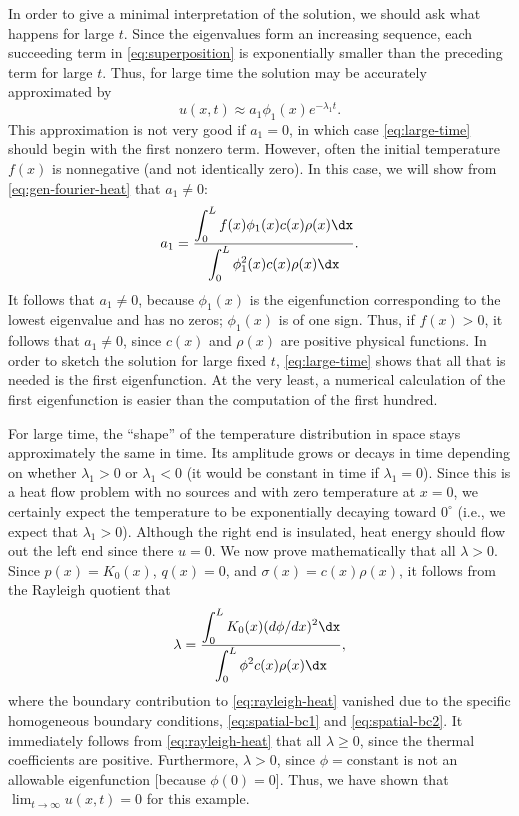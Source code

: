 In order to give a minimal interpretation of the solution, we should ask what happens for large $t$.  Since the eigenvalues form an increasing sequence, each succeeding term in \eqref{eq:superposition} is exponentially smaller than the preceding term for large $t$.  Thus, for large time the solution may be accurately approximated by
\begin{equation}
\label{eq:large-time}
u(x,t) \approx a_1\phi_1(x)e^{-\lambda_1 t}.
\end{equation}
This approximation is not very good if $a_1 = 0$, in which case \eqref{eq:large-time} should begin with the first nonzero term.  However, often the initial temperature $f(x)$ is nonnegative (and not identically zero).  In this case, we will show from \eqref{eq:gen-fourier-heat} that $a_1 \neq 0$:
\begin{equation}
\label{eq:a1-nonzero}
a_1 = \frac{\displaystyle\int_0^L f(x)\phi_1(x)c(x)\rho(x)\dx}{\displaystyle\int_0^L \phi_1^2(x)c(x)\rho(x)\dx}.
\end{equation}
It follows that $a_1 \neq 0$, because $\phi_1(x)$ is the eigenfunction corresponding to the lowest eigenvalue and has no zeros; $\phi_1(x)$ is of one sign.  Thus, if $f(x) > 0$, it follows that $a_1 \neq 0$, since $c(x)$ and $\rho(x)$ are positive physical functions.  In order to sketch the solution for large fixed $t$, \eqref{eq:large-time} shows that all that is needed is the first eigenfunction.  At the very least, a numerical calculation of the first eigenfunction is easier than the computation of the first hundred.

For large time, the ``shape'' of the temperature distribution in space stays approximately the same in time.  Its amplitude grows or decays in time depending on whether $\lambda_1 > 0$ or $\lambda_1 < 0$ (it would be constant in time if $\lambda_1 = 0$).  Since this is a heat flow problem with no sources and with zero temperature at $x = 0$, we certainly expect the temperature to be exponentially decaying toward $0^\circ$ (i.e., we expect that $\lambda_1 > 0$).  Although the right end is insulated, heat energy should flow out the left end since there $u = 0$.  We now prove mathematically that all $\lambda > 0$.  Since $p(x) = K_0(x)$, $q(x) = 0$, and $\sigma(x) = c(x)\rho(x)$, it follows from the Rayleigh quotient that
\begin{equation}
\label{eq:rayleigh-heat}
\lambda = \frac{\displaystyle\int_0^L K_0(x)(d\phi/dx)^2\dx}{\displaystyle\int_0^L \phi^2 c(x)\rho(x)\dx},
\end{equation}
where the boundary contribution to \eqref{eq:rayleigh-heat} vanished due to the specific homogeneous boundary conditions, \eqref{eq:spatial-bc1} and \eqref{eq:spatial-bc2}.  It immediately follows from \eqref{eq:rayleigh-heat} that all $\lambda \ge 0$, since the thermal coefficients are positive.  Furthermore, $\lambda > 0$, since $\phi = \text{constant}$ is not an allowable eigenfunction [because $\phi(0) = 0$].  Thus, we have shown that $\lim_{t\to\infty} u(x,t) = 0$ for this example.

